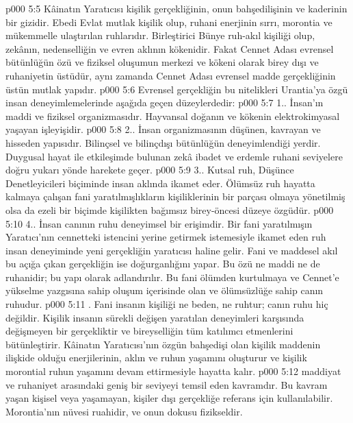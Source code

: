 \vs p000 5:5 Kâinatın Yaratıcısı kişilik gerçekliğinin, onun bahşedilişinin ve kaderinin bir gizidir. Ebedi Evlat mutlak kişilik olup, ruhani enerjinin sırrı, morontia ve mükemmelle ulaştırılan ruhlarıdır. Birleştirici Bünye ruh\hyp{}akıl kişiliği olup, zekânın, nedenselliğin ve evren aklının kökenidir. Fakat Cennet Adası evrensel bütünlüğün özü ve fiziksel oluşumun merkezi ve kökeni olarak birey dışı ve ruhaniyetin üstüdür, aynı zamanda Cennet Adası evrensel madde gerçekliğinin üstün mutlak yapıdır.
\vs p000 5:6 Evrensel gerçekliğin bu nitelikleri Urantia’ya özgü insan deneyimlemelerinde aşağıda geçen düzeylerdedir:
\vs p000 5:7 1.\bibnobreakspace {}. İnsan’ın maddi ve fiziksel organizmasıdır. Hayvansal doğanın ve kökenin elektrokimyasal yaşayan işleyişidir.
\vs p000 5:8 2.\bibnobreakspace {}. İnsan organizmasının düşünen, kavrayan ve hisseden yapısıdır. Bilinçsel ve bilinçdışı bütünlüğün deneyimlendiği yerdir. Duygusal hayat ile etkileşimde bulunan zekâ ibadet ve erdemle ruhani seviyelere doğru yukarı yönde harekete geçer.
\vs p000 5:9 3.\bibnobreakspace {}. Kutsal ruh, Düşünce Denetleyicileri biçiminde insan aklında ikamet eder. Ölümsüz ruh hayatta kalmaya çalışan fani yaratılmışlıkların kişiliklerinin bir parçası olmaya yönetilmiş olsa da ezeli bir biçimde kişilikten bağımsız birey\hyp{}öncesi düzeye özgüdür.
\vs p000 5:10 4.\bibnobreakspace {}. İnsan canının ruhu deneyimsel bir erişimdir. Bir fani yaratılmışın Yaratıcı’nın cennetteki istencini yerine getirmek istemesiyle ikamet eden ruh insan deneyiminde yeni gerçekliğin yaratıcısı haline gelir. Fani ve maddesel akıl bu açığa çıkan gerçekliğin ise doğurganlığını yapar. Bu  özü ne maddi ne de ruhanidir; bu yapı  olarak adlandırılır. Bu fani ölümden kurtulmaya ve Cennet’e yükselme yazgısına sahip oluşum içerisinde olan ve ölümsüzlüğe sahip canın ruhudur.
\vs p000 5:11 . Fani insanın kişiliği ne beden, ne ruhtur; canın ruhu hiç değildir. Kişilik insanın sürekli değişen yaratılan deneyimleri karşısında değişmeyen bir gerçekliktir ve bireyselliğin tüm katılımcı etmenlerini bütünleştirir. Kâinatın Yaratıcısı’nın özgün bahşedişi olan kişilik maddenin ilişkide olduğu enerjilerinin, aklın ve ruhun yaşamını oluşturur ve kişilik morontial ruhun yaşamını devam ettirmesiyle hayatta kalır.
\vs p000 5:12  maddiyat ve ruhaniyet arasındaki geniş bir seviyeyi temsil eden kavramdır. Bu kavram yaşan kişisel veya yaşamayan, kişiler dışı gerçekliğe referans için kullanılabilir. Morontia’nın nüvesi ruahidir, ve onun dokusu fizikseldir.

